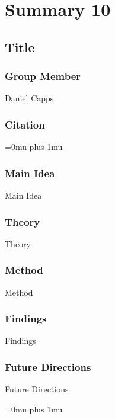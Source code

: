 \section{Summary 10}

\noindent
\subsection{Title}

\subsubsection{Group Member}

\noindent
Daniel Capps

\noindent
\subsubsection{Citation}

\Urlmuskip=0mu plus 1mu\relax

\subsubsection{Main Idea}

\noindent
Main Idea

\subsubsection{Theory}

\noindent
Theory

\subsubsection{Method}

\noindent
Method

\subsubsection{Findings}

\noindent
Findings

\subsubsection{Future Directions}

\noindent
Future Directions 

\Urlmuskip=0mu plus 1mu\relax

